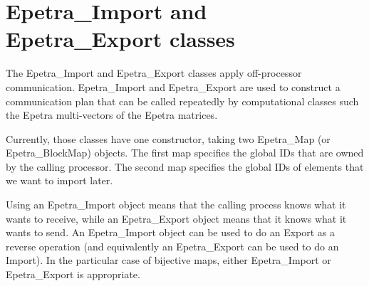 
\section{Epetra\_Import and Epetra\_Export classes}
\label{sec:import_export}

The Epetra\_Import and Epetra\_Export classes apply off-processor
communication. Epetra\_Import and Epetra\_Export are used to construct a
communication plan that can be called repeatedly by computational
classes such the Epetra multi-vectors of the Epetra matrices.

Currently, those classes have one constructor, taking two Epetra\_Map
(or Epetra\_BlockMap) objects. The first map specifies the global IDs
that are owned by the calling processor. The second map specifies the
global IDs of elements that we want to import later.

Using an Epetra\_Import object means that the calling process knows what
it wants to receive, while an Epetra\_Export object means that it knows
what it wants to send. An Epetra\_Import object can be used to do an
Export as a reverse operation (and equivalently an Epetra\_Export can be
used to do an Import). In the particular case of bijective maps, either
Epetra\_Import or Epetra\_Export is appropriate.

\medskip

